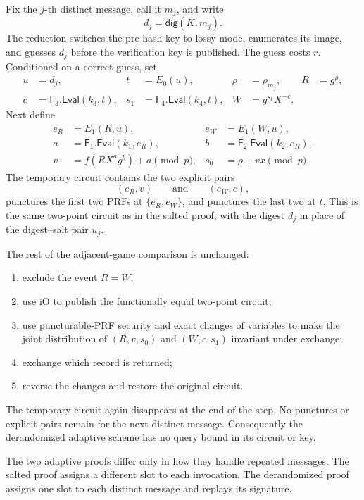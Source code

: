\documentclass[11pt]{article}
\newcommand{\Eval}{\mathsf{Eval}}
\begin{document}
Fix the \(j\)-th distinct message, call it \(m_j\), and write
\[
  d_j=\mathsf{dig}(K,m_j).
\]
The reduction switches the pre-hash key to lossy mode, enumerates its image,
and guesses \(d_j\) before the verification key is published.  The guess
costs \(r\).  Conditioned on a correct guess, set
\[
\begin{aligned}
  u&=d_j,&
  t&=E_0(u),&
  \rho&=\rho_{m_j},&
  R&=g^\rho,\\
  c&=\mathsf{F}_3.\Eval(k_3,t),&
  s_1&=\mathsf{F}_4.\Eval(k_4,t),&
  W&=g^{s_1}X^{-c}.
\end{aligned}
\]
Next define
\[
\begin{aligned}
  e_R&=E_1(R,u),&
  e_W&=E_1(W,u),\\
  a&=\mathsf{F}_1.\Eval(k_1,e_R),&
  b&=\mathsf{F}_2.\Eval(k_2,e_R),\\
  v&=f(RX^ag^b)+a\pmod p,&
  s_0&=\rho+vx\pmod p.
\end{aligned}
\]
The temporary circuit contains the two explicit pairs
\[
  (e_R,v)
  \qquad\text{and}\qquad
  (e_W,c),
\]
punctures the first two PRFs at \(\{e_R,e_W\}\), and punctures the last two at
\(t\).  This is the same two-point circuit as in the salted proof, with the
digest \(d_j\) in place of the digest--salt pair \(u_j\).

The rest of the adjacent-game comparison is unchanged:

\begin{enumerate}[leftmargin=2em]
\item exclude the event \(R=W\);
\item use iO to publish the functionally equal two-point circuit;
\item use puncturable-PRF security and exact changes of variables to make
      the joint distribution of \((R,v,s_0)\) and \((W,c,s_1)\) invariant
      under exchange;
\item exchange which record is returned;
\item reverse the changes and restore the original circuit.
\end{enumerate}

The temporary circuit again disappears at the end of the step.  No punctures
or explicit pairs remain for the next distinct message.  Consequently the
derandomized adaptive scheme has no query bound in its circuit or key.

The two adaptive proofs differ only in how they handle repeated messages.
The salted proof assigns a different slot to each invocation.  The
derandomized proof assigns one slot to each distinct message and replays its
signature.
\end{document}
